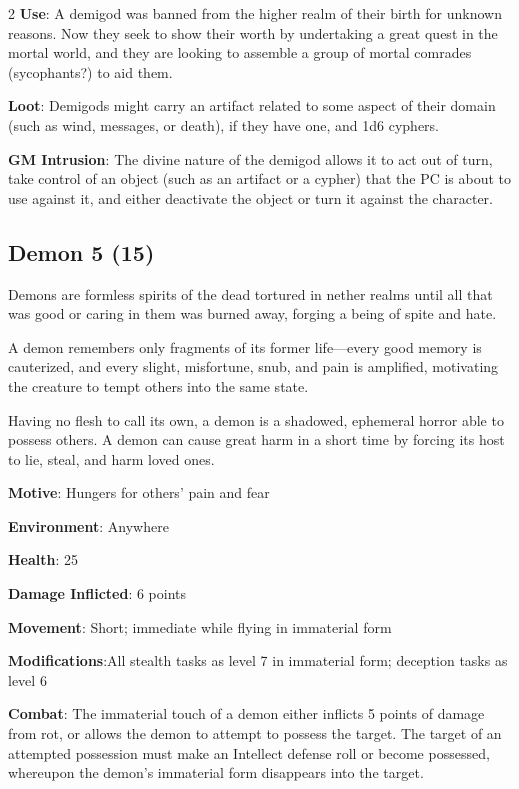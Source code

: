 \begin{multicols}{2}
\textbf{Use}: A demigod was banned from the higher realm of their birth for unknown reasons. Now they seek to show their worth by undertaking a great quest in the mortal world, and they are looking to assemble a group of mortal comrades (sycophants?) to aid them.

\textbf{Loot}: Demigods might carry an artifact related to some aspect of their domain (such as wind, messages, or death), if they have one, and 1d6 cyphers.

\textbf{GM Intrusion}: The divine nature of the demigod allows it to act out of turn, take control of an object (such as an artifact or a cypher) that the PC is about to use against it, and either deactivate the object or turn it against the character.

\subsection{Demon	5 (15)}

Demons are formless spirits of the dead tortured in nether realms until all that was good or caring in them was burned away, forging a being of spite and hate.

A demon remembers only fragments of its former life—every good memory is cauterized, and every slight, misfortune, snub, and pain is amplified, motivating the creature to tempt others into the same state.

Having no flesh to call its own, a demon is a shadowed, ephemeral horror able to possess others. A demon can cause great harm in a short time by forcing its host to lie, steal, and harm loved ones.

\textbf{Motive}: Hungers for others’ pain and fear

\textbf{Environment}: Anywhere

\textbf{Health}: 25

\textbf{Damage Inflicted}: 6 points

\textbf{Movement}: Short; immediate while flying in immaterial form 

\textbf{Modifications}:All stealth tasks as level 7 in immaterial form; deception tasks as level 6

\textbf{Combat}: The immaterial touch of a demon either inflicts 5 points of damage from rot, or allows the demon to attempt to possess the target. The target of an attempted possession must make an Intellect defense roll or become possessed, whereupon the demon’s immaterial form disappears into the target.


\end{multicols}
